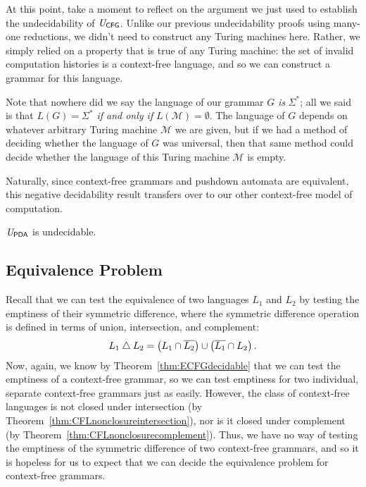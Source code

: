 At this point, take a moment to reflect on the argument we just used to establish the undecidability of $\mathit{U}_{\textsf{CFG}}$. Unlike our previous undecidability proofs using many-one reductions, we didn't need to construct any Turing machines here. Rather, we simply relied on a property that is true of any Turing machine: the set of invalid computation histories is a context-free language, and so we can construct a grammar for this language.

\begin{dangerous}
Note that nowhere did we say the language of our grammar $G$ \emph{is} $\Sigma^{*}$; all we said is that $L(G) = \Sigma^{*}$ \emph{if and only if} $L(\mathcal{M}) = \emptyset$. The language of $G$ depends on whatever arbitrary Turing machine $\mathcal{M}$ we are given, but if we had a method of deciding whether the language of $G$ was universal, then that same method could decide whether the language of this Turing machine $\mathcal{M}$ is empty.
\end{dangerous}

Naturally, since context-free grammars and pushdown automata are equivalent, this negative decidability result transfers over to our other context-free model of computation.

\begin{corollary}\label{cor:UPDAundecidable}
$\mathit{U}_{\textsf{PDA}}$ is undecidable.
\end{corollary}

\subsection*{Equivalence Problem}

Recall that we can test the equivalence of two languages $L_{1}$ and $L_{2}$ by testing the emptiness of their symmetric difference, where the symmetric difference operation is defined in terms of union, intersection, and complement:
\begin{equation*}
L_{1} \mathbin{\triangle} L_{2} = \left( L_{1} \cap \overline{L_{2}} \right) \cup \left( \overline{L_{1}} \cap L_{2} \right).
\end{equation*}
Now, again, we know by Theorem~\ref{thm:ECFGdecidable} that we can test the emptiness of a context-free grammar, so we can test emptiness for two individual, separate context-free grammars just as easily. However, the class of context-free languages is not closed under intersection (by Theorem~\ref{thm:CFLnonclosureintersection}), nor is it closed under complement (by Theorem~\ref{thm:CFLnonclosurecomplement}). Thus, we have no way of testing the emptiness of the symmetric difference of two context-free grammars, and so it is hopeless for us to expect that we can decide the equivalence problem for context-free grammars.

